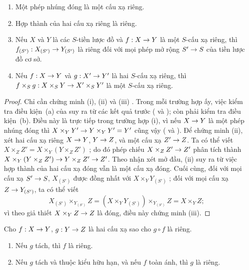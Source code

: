 \documentclass[oneside,10pt]{amsart}
\makeatletter
\newcommand{\ega@arrow}[2]{\mathchoice{#1}{#2}{#2}{#2}}
\renewcommand{\to}{\ega@arrow{\longrightarrow}{\rightarrow}}
\newcommand{\oldpage}[2][]{\marginnote{\normalfont\footnotesize\textbf{#1}~|~#2}\ignorespaces}
\let\EGAOriginalLabel\label
\renewcommand{\label}[1]{\phantomsection\EGAOriginalLabel{#1}}
\makeatother
\begin{document}
\begin{proposition}[5.4.2]
\label{II.5.4.2}
\medskip\noindent
\begin{enumerate}
  \item[{\rm(i)}] Một phép nhúng đóng là một cấu xạ riêng.
  \item[{\rm(ii)}] Hợp thành của hai cấu xạ riêng là riêng.
  \item[{\rm(iii)}] Nếu $X$ và $Y$ là các $S$-tiền lược đồ và $f:X\to Y$ là một $S$-cấu xạ riêng, thì $f_{(S')}:X_{(S')}\to Y_{(S')}$ là riêng đối với mọi phép mở rộng $S'\to S$ của tiền lược đồ cơ sở.
  \item[{\rm(iv)}] Nếu $f:X\to Y$ và $g:X'\to Y'$ là hai $S$-cấu xạ riêng, thì $f\times_S g:X\times_S Y\to X'\times_S Y'$ là một $S$-cấu xạ riêng.
\end{enumerate}
\end{proposition}
\oldpage[II]{101}
\begin{proof}
Chỉ cần chứng minh (i), (ii) và (iii) .
Trong mỗi trường hợp ấy, việc kiểm tra điều kiện~(a) của  suy ra từ các kết quả trước ( và ); còn phải kiểm tra điều kiện~(b).
Điều này là trực tiếp trong trường hợp (i), vì nếu $X\to Y$ là một phép nhúng đóng thì $X\times_Y Y'\to Y\times_Y Y'=Y'$ cũng vậy ( và ).
Để chứng minh (ii), xét hai cấu xạ riêng $X\to Y$, $Y\to Z$, và một cấu xạ $Z'\to Z$.
Ta có thể viết $X\times_Z Z'=X\times_Y(Y\times_Z Z')$ ; do đó phép chiếu $X\times_Z Z'\to Z'$ phân tích thành $X\times_Y(Y\times_Z Z')\to Y\times_Z Z'\to Z'$.
Theo nhận xét mở đầu, (ii) suy ra từ việc hợp thành của hai cấu xạ đóng vẫn là một cấu xạ đóng.
Cuối cùng, đối với mọi cấu xạ $S'\to S$, $X_{(S')}$ được đồng nhất với $X\times_Y Y_{(S')}$ ; đối với mọi cấu xạ $Z\to Y_{(S')}$, ta có thể viết
\[
  X_{(S')}\times_{Y_{(S')}}Z=(X\times_Y Y_{(S')})\times_{Y_{(S')}}Z=X\times_Y Z;
\]
vì theo giả thiết $X\times_Y Z\to Z$ là đóng, điều này chứng minh (iii).
\end{proof}

\begin{corollary}[5.4.3]
\label{II.5.4.3}
Cho $f:X\to Y$, $g:Y\to Z$ là hai cấu xạ sao cho $g\circ f$ là riêng.
\begin{enumerate}
  \item[{\rm(i)}] Nếu $g$ tách, thì $f$ là riêng.
  \item[{\rm(ii)}] Nếu $g$ tách và thuộc kiểu hữu hạn, và nếu $f$ toàn ánh, thì $g$ là riêng.
\end{enumerate}
\end{corollary}
\end{document}
